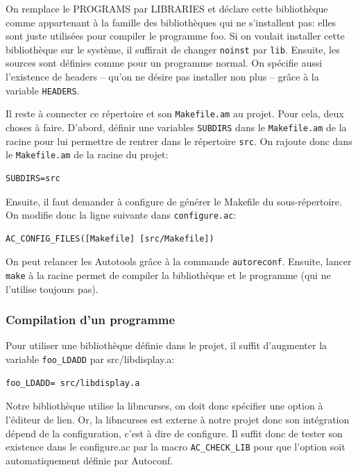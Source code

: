 \documentclass[11pt,a4paper]{article}
\begin{document}
On remplace le PROGRAMS par LIBRARIES et déclare cette bibliothèque
comme appartenant à la famille des bibliothèques qui ne s'installent
pas: elles sont juste utilisées pour compiler le programme foo. Si on
voulait installer cette bibliothèque sur le système, il suffirait de
changer \texttt{noinst} par \texttt{lib}. Ensuite, les sources sont
définies comme pour un programme normal. On spécifie aussi l'existence
de headers -- qu'on ne désire pas installer non plus -- grâce à la
variable \texttt{HEADERS}.

Il reste à connecter ce répertoire et son \texttt{Makefile.am} au
projet. Pour cela, deux choses à faire. D'abord, définir une variables
\texttt{SUBDIRS} dans le \texttt{Makefile.am} de la racine pour lui
permettre de rentrer dans le répertoire \texttt{src}. On rajoute donc
dans le \texttt{Makefile.am} de la racine du projet:

{\small
\begin{verbatim}
SUBDIRS=src
\end{verbatim}
}

Ensuite, il faut demander à configure de générer le Makefile du
sous-répertoi\-re. On modifie donc la ligne suivante dans
\texttt{configure.ac}:
{\small
\begin{verbatim}
AC_CONFIG_FILES([Makefile] [src/Makefile])
\end{verbatim}
}

On peut relancer les Autotools grâce à la commande
\texttt{autoreconf}. Ensuite, lancer \texttt{make} à la racine permet
de compiler la bibliothèque et le programme (qui ne l'utilise toujours
pas).

\subsubsection{Compilation d'un programme}

Pour utiliser une bibliothèque définie dans le projet, il suffit
d'augmenter la variable \texttt{foo\_LDADD} par
src/libdisplay.a:

{\small
\begin{verbatim}
foo_LDADD= src/libdisplay.a
\end{verbatim}
}

Notre bibliothèque utilise la libncurses, on doit donc spécifier une
option à l'éditeur de lien. Or, la libncurses est externe à notre
projet donc son intégration dépend de la configuration, c'est à dire
de configure. Il suffit donc de tester son existence dans le
configure.ac par la macro \texttt{AC\_CHECK\_LIB} pour que l'option soit
automatiquement définie par Autoconf.
\end{document}
